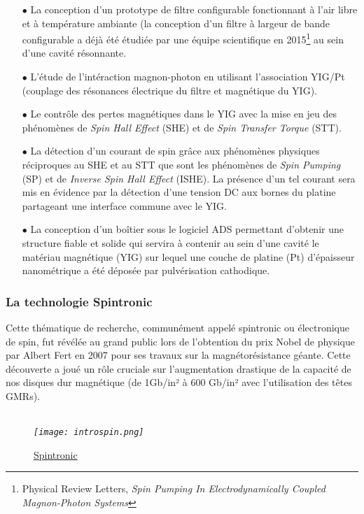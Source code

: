 \documentclass[12pt,fleqn]{book} %
\begin{document}
\begin{itemize}
 \item[$\bullet$] La conception d'un prototype de filtre configurable fonctionnant à l'air libre et à température ambiante (la conception d'un filtre à largeur de bande configurable a déjà été étudiée par une équipe scientifique en 2015\footnote{Physical Review Letters, \emph{Spin Pumping In Electrodynamically Coupled Magnon-Photon Systems}} au sein d'une cavité résonnante.
 \item[$\bullet$] L'étude de l'intéraction magnon-photon en utilisant l'association YIG/Pt (couplage des résonances électrique du filtre et magnétique du YIG).
 \item[$\bullet$] Le contrôle des pertes magnétiques dans le YIG avec la mise en jeu des phénomènes de \emph{Spin Hall Effect} (SHE) et de \emph{Spin Transfer Torque} (STT).
 \item[$\bullet$] La détection d’un courant de spin grâce aux phénomènes physiques réciproques au SHE et au STT que sont les phénomènes de \emph{Spin Pumping} (SP) et de \emph{Inverse Spin Hall Effect} (ISHE). La présence d'un tel courant sera mis en évidence par la détection d'une tension DC aux bornes du platine partageant une interface commune avec le YIG.
 \item[$\bullet$] La conception d’un boîtier sous le logiciel ADS permettant d’obtenir une structure fiable et solide qui servira à contenir au sein d’une cavité le matériau magnétique (YIG) sur lequel
une couche de platine (Pt) d’épaisseur nanométrique a été déposée par pulvérisation
cathodique.
\end{itemize}
\setcounter{chapter}{1}
\subsubsection{La technologie Spintronic}
\noindent Cette thématique de recherche, communément appelé spintronic ou électronique de
spin, fut révélée au grand public lors de l’obtention du prix Nobel de physique par Albert
Fert en 2007 pour ses travaux sur la magnétorésistance géante. Cette découverte
a joué un rôle cruciale sur l’augmentation drastique de la capacité de nos disques dur
magnétique (de 1Gb/in² à 600 Gb/in² avec l'utilisation des têtes GMRs).
~\\\\
\begin{figure}[H]
	\centering
	\itshape
	\texttt{[image: introspin.png]}
	\caption{\label{introspin} \underline{Spintronic}}
\end{figure}
\end{document}
